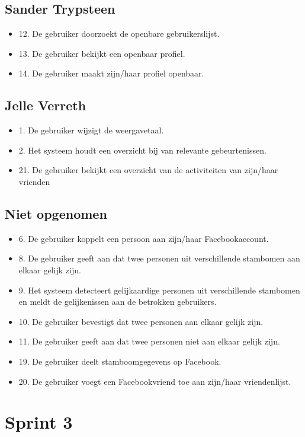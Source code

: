 \documentclass[pdftex,a4paper,12pt,twoside]{report}
\begin{document}
\subsection{Sander Trypsteen}
\begin{itemize}
\item 12. De gebruiker doorzoekt de openbare gebruikerslijst. 
\item 13. De gebruiker bekijkt een openbaar profiel. 
\item 14. De gebruiker maakt zijn/haar profiel openbaar. 
\end{itemize}

\subsection{Jelle Verreth}
\begin{itemize}
\item 1. De gebruiker wijzigt de weergavetaal. 
\item 2. Het systeem houdt een overzicht bij van relevante gebeurtenissen. 
\item 21. De gebruiker bekijkt een overzicht van de activiteiten van zijn/haar vrienden
\end{itemize}
\subsection{Niet opgenomen}
\begin{itemize}
\item 6. De gebruiker koppelt een persoon aan zijn/haar Facebookaccount. 
\item 8. De gebruiker geeft aan dat twee personen uit verschillende stambomen aan elkaar gelijk zijn. 
\item 9. Het systeem detecteert gelijkaardige personen uit verschillende stambomen en meldt de 
gelijkenissen aan de betrokken gebruikers. 
\item 10. De gebruiker bevestigt dat twee personen aan elkaar gelijk zijn. 
\item 11. De gebruiker geeft aan dat twee personen niet aan elkaar gelijk zijn.
\item 19. De gebruiker deelt stamboomgegevens op Facebook. 
\item 20. De gebruiker voegt een Facebookvriend toe aan zijn/haar vriendenlijst. 
\end{itemize}
\newpage
\section{Sprint 3}
\end{document}
